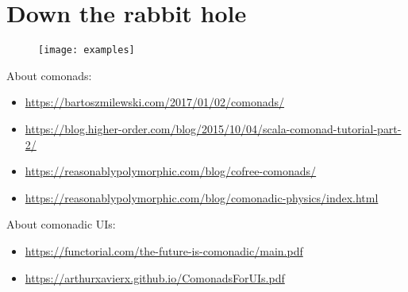 \documentclass[10pt]{beamer}
\begin{document}
\begin{frame}[fragile]
  \begin{lstlisting}[language=haskell, basicstyle=\ttfamily]
  \end{lstlisting}
\end{frame}

\begin{frame}[fragile]
  \begin{lstlisting}[language=haskell, basicstyle=\ttfamily]
  \end{lstlisting}
\end{frame}


\section{Down the rabbit hole}

\begin{frame}[fragile]
\begin{figure}
    \centering
    \texttt{[image: examples]}
  \end{figure}
\end{frame}


\begin{frame}[fragile]
  About comonads:
  \begin{itemize}
    \item \url{https://bartoszmilewski.com/2017/01/02/comonads/}
    \item \url{https://blog.higher-order.com/blog/2015/10/04/scala-comonad-tutorial-part-2/}
    \item \url{https://reasonablypolymorphic.com/blog/cofree-comonads/}
    \item \url{https://reasonablypolymorphic.com/blog/comonadic-physics/index.html}
  \end{itemize}
\end{frame}
\begin{frame}[fragile]
  About comonadic UIs:
  \begin{itemize}
    \item \url{https://functorial.com/the-future-is-comonadic/main.pdf}
    \item \url{https://arthurxavierx.github.io/ComonadsForUIs.pdf}
  \end{itemize}
\end{frame}
\end{document}
